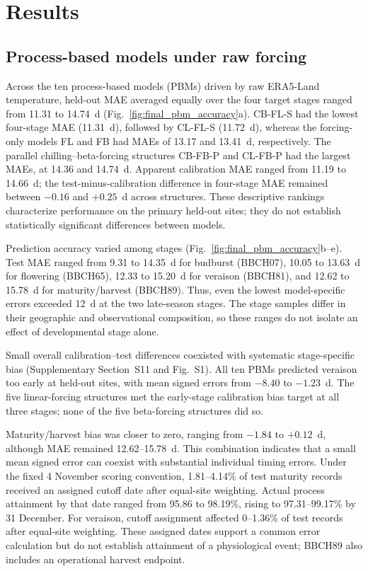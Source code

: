 \documentclass[a4paper,12pt]{article}
\let\OriginalSection\section
\renewcommand{\section}{\FloatBarrier\OriginalSection}
\let\OriginalSubsection\subsection
\renewcommand{\subsection}{\FloatBarrier\OriginalSubsection}
\begin{document}
\section{Results}

\subsection{Process-based models under raw forcing}
\label{sec:raw_pbm_results}

Across the ten process-based models (PBMs) driven by raw ERA5-Land temperature, held-out MAE averaged equally over the four target stages ranged from 11.31 to 14.74~d (Fig.~\ref{fig:final_pbm_accuracy}a). CB-FL-S had the lowest four-stage MAE (11.31~d), followed by CL-FL-S (11.72~d), whereas the forcing-only models FL and FB had MAEs of 13.17 and 13.41~d, respectively. The parallel chilling--beta-forcing structures CB-FB-P and CL-FB-P had the largest MAEs, at 14.36 and 14.74~d. Apparent calibration MAE ranged from 11.19 to 14.66~d; the test-minus-calibration difference in four-stage MAE remained between $-0.16$ and $+0.25$~d across structures. These descriptive rankings characterize performance on the primary held-out sites; they do not establish statistically significant differences between models.

Prediction accuracy varied among stages (Fig.~\ref{fig:final_pbm_accuracy}b--e). Test MAE ranged from 9.31 to 14.35~d for budburst (BBCH07), 10.05 to 13.63~d for flowering (BBCH65), 12.33 to 15.20~d for veraison (BBCH81), and 12.62 to 15.78~d for maturity/harvest (BBCH89). Thus, even the lowest model-specific errors exceeded 12~d at the two late-season stages. The stage samples differ in their geographic and observational composition, so these ranges do not isolate an effect of developmental stage alone.

Small overall calibration--test differences coexisted with systematic stage-specific bias (Supplementary Section~S11 and Fig.~S1). All ten PBMs predicted veraison too early at held-out sites, with mean signed errors from $-8.40$ to $-1.23$~d. The five linear-forcing structures met the early-stage calibration bias target at all three stages; none of the five beta-forcing structures did so.

Maturity/harvest bias was closer to zero, ranging from $-1.84$ to $+0.12$~d, although MAE remained 12.62--15.78~d. This combination indicates that a small mean signed error can coexist with substantial individual timing errors. Under the fixed 4 November scoring convention, 1.81--4.14\% of test maturity records received an assigned cutoff date after equal-site weighting. Actual process attainment by that date ranged from 95.86 to 98.19\%, rising to 97.31--99.17\% by 31 December. For veraison, cutoff assignment affected 0--1.36\% of test records after equal-site weighting. These assigned dates support a common error calculation but do not establish attainment of a physiological event; BBCH89 also includes an operational harvest endpoint.
\end{document}
